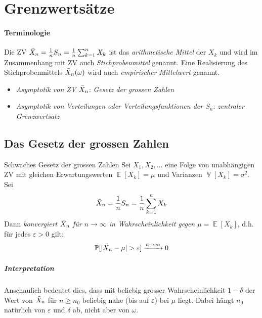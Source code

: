 \documentclass[a4paper,10pt]{article}
\renewcommand{\P}{\operatorname{\mathbb{P}}}
\DeclareMathOperator{\E}{\mathbb{E}}
\DeclareMathOperator{\V}{\mathbb{V}}
\numberwithin{equation}{section}
\begin{document}
\section{Grenzwertsätze}


\paragraph{Terminologie} Die ZV \( \Bar{X}_n = \frac{1}{n} S_n = \frac{1}{n} \sum_{k = 1}^n X_k \) ist das \emph{arithmetische Mittel} der \( X_k \) und wird im Zusammenhang mit ZV auch \emph{Stichprobenmittel} genannt. Eine Realisierung des Stichprobenmittels \( \Bar{X}_n(\omega) \) wird auch \emph{empirischer Mittelwert} genannt.

\begin{itemize}
    \item \emph{Asymptotik von ZV \( \Bar{X}_n \)}: \emph{Gesetz der grossen Zahlen}
    \item \emph{Asymptotik von Verteilungen oder Verteilungsfunktionen der \( S_n \)}: \emph{zentraler Grenzwertsatz}
\end{itemize}

\subsection{Das Gesetz der grossen Zahlen}

\begin{mainbox}{Schwaches Gesetz der grossen Zahlen}
    Sei \( X_ 1, X_2, \dots \) eine Folge von unabhängigen ZV mit gleichen Erwartungswerten \( \E[X_k] = \mu \) und Varianzen \( \V[X_k] = \sigma^2 \). Sei
    \[
        \Bar{X}_n = \frac{1}{n} S_n = \frac{1}{n} \sum_{k = 1}^n X_k
    \]
    Dann \emph{konvergiert \( \Bar{X}_n \) für \( n \to \infty \) in Wahrscheinlichkeit gegen \( \mu = \E[X_k] \)}, d.h. für jedes \( \varepsilon > 0 \) gilt:
    \[
        \P[|\Bar{X}_n - \mu | > \varepsilon] \xrightarrow{n \to \infty} 0
    \]
\end{mainbox}

\subparagraph{Interpretation} Anschaulich bedeutet dies, dass mit beliebig grosser Wahrscheinlichkeit \( 1 - \delta \) der Wert von \( \Bar{X}_n \) für \( n \geq n_0 \) beliebig nahe (bis auf \( \varepsilon \)) bei \( \mu \) liegt. Dabei hängt \( n_0 \) natürlich von \( \varepsilon \) und \( \delta \) ab, nicht aber von \( \omega \).
\end{document}
